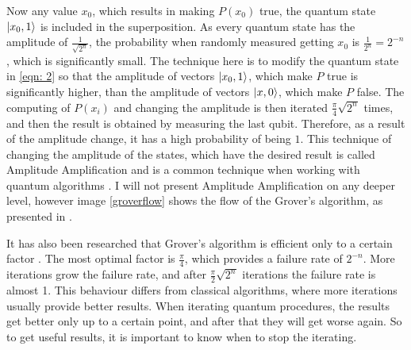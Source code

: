 \documentclass[english,oneside,openright]{UH_DS_report}
\begin{document}
Now any value $x_{0}$, which results in making $P(x_{0})$ true, the quantum state $\ket{x_{0}, 1}$ is included in the superposition. As every quantum state has the amplitude of $\frac{1}{\sqrt{2^{n}}}$, the probability when randomly measured getting $x_0$ is $\frac{1}{2^{n}} = 2^{-n}$, which is significantly small. The technique here is to modify the quantum state in \ref{eqn: 2} so that the amplitude of vectors $\ket{x_{0}, 1}$, which make $P$ true is significantly higher, than the amplitude of vectors $\ket{x, 0}$, which make $P$ false. The computing of $P(x_{i})$ and changing the amplitude is then iterated $\frac{\pi}{4} \sqrt{2^{n}}$ times, and then the result is obtained by measuring the last qubit. Therefore, as a result of the amplitude change, it has a high probability of being $1$. This technique of changing the amplitude of the states, which have the desired result is called Amplitude Amplification and is a common technique when working with quantum algorithms \cite{lavor2003grover}. I will not present Amplitude Amplification on any deeper level, however image \ref{groverflow} shows the flow of the Grover's algorithm, as presented in \cite{zhang2020recent}.

It has also been researched that Grover's algorithm is efficient only to a certain factor \cite{introtoqc}. The most optimal factor is $\frac{\pi}{4}$, which provides a failure rate of $2^{-n}$. More iterations grow the failure rate, and after $\frac{\pi}{2}\sqrt{2^{n}}$ iterations the failure rate is almost 1. This behaviour differs from classical algorithms, where more iterations usually provide better results. When iterating quantum procedures, the results get better only up to a certain point, and after that they will get worse again. So to get useful results, it is important to know when to stop the iterating.
\end{document}
